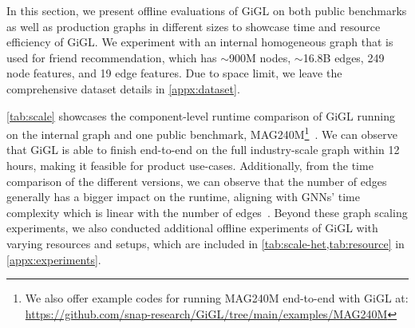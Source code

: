 

In this section, we present offline evaluations of GiGL on both public benchmarks as well as production graphs in different sizes to showcase time and resource efficiency of GiGL. We experiment with an internal homogeneous graph that is used for friend recommendation, which has $\sim${900M} nodes, $\sim${16.8B} edges, 249 node features, and 19 edge features. Due to space limit, we leave the comprehensive dataset details in \cref{appx:dataset}.

\cref{tab:scale} showcases the component-level runtime comparison of GiGL running on the internal graph and one public benchmark, MAG240M\footnote{We also offer example codes for running MAG240M end-to-end with GiGL at: \url{https://github.com/snap-research/GiGL/tree/main/examples/MAG240M}}~\citep{hu2021ogblsc}. We can observe that GiGL is able to finish end-to-end on the full industry-scale graph within 12 hours, making it feasible for product use-cases. Additionally, from the time comparison of the different versions, we can observe that the number of edges generally has a bigger impact on the runtime, aligning with GNNs' time complexity which is linear with the number of edges~\citep{wu2020comprehensive}. Beyond these graph scaling experiments, we also conducted additional offline experiments of GiGL with varying resources and setups, which are included in \cref{tab:scale-het,tab:resource} in \cref{appx:experiments}. 
